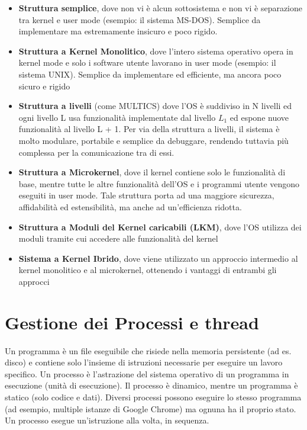 \documentclass{article}
\begin{document}
\begin{itemize}
    \item \textbf{Struttura semplice}, dove non vi è alcun sottosistema e non vi è separazione tra kernel e user mode (esempio: il sistema MS-DOS). Semplice da implementare ma estremamente insicuro e poco rigido.
    \item  \textbf{Struttura a Kernel Monolitico}, dove l'intero sistema operativo opera in kernel mode e solo i software utente lavorano in user mode (esempio: il sistema UNIX). Semplice da implementare ed efficiente, ma ancora poco sicuro e rigido
    \item \textbf{Struttura a livelli} (come MULTICS) dove l'OS è suddiviso in N livelli ed ogni livello L usa funzionalità implementate dal livello $L_{1}$ ed espone nuove funzionalità al livello L + 1. Per via della struttura a livelli, il sistema è molto modulare, portabile e semplice da debuggare, rendendo tuttavia più complessa per la comunicazione tra di essi.
    \item \textbf{Struttura a Microkernel}, dove il kernel contiene solo le funzionalità di base, mentre tutte le altre funzionalità dell'OS e i programmi utente vengono eseguiti in user mode. Tale struttura porta ad una maggiore sicurezza, affidabilità ed estensibilità, ma anche ad un'efficienza ridotta.
    \item \textbf{Struttura a Moduli del Kernel caricabili (LKM)}, dove l'OS utilizza dei moduli tramite cui accedere alle funzionalità del kernel
    \item \textbf{Sistema a Kernel Ibrido}, dove viene utilizzato un approccio intermedio al kernel monolitico e al microkernel, ottenendo i vantaggi di entrambi gli approcci
\end{itemize}
\pagebreak
\section{Gestione dei Processi e thread}

Un programma è un file eseguibile che risiede nella memoria persistente (ad es. disco) e contiene solo l'insieme di istruzioni necessarie per eseguire un lavoro specifico. Un processo è l'astrazione del sistema operativo di un programma in esecuzione (unità di esecuzione). Il processo è dinamico, mentre un programma è statico (solo codice e dati). Diversi processi possono eseguire lo stesso programma (ad esempio, multiple istanze di Google Chrome) ma ognuna ha il proprio stato. Un processo esegue un'istruzione alla volta, in sequenza. \\
\end{document}
